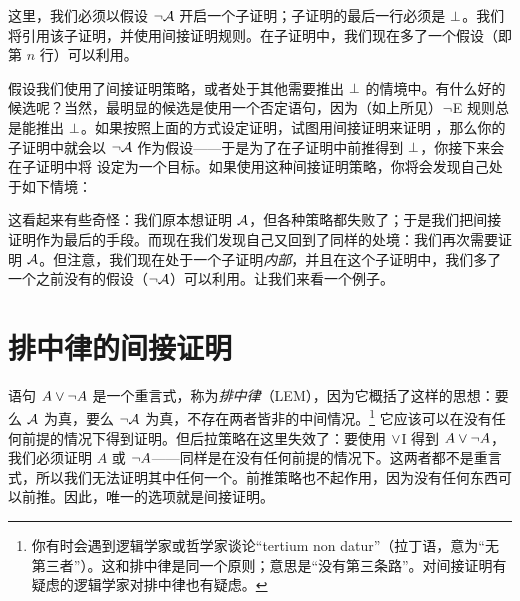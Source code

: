 \begin{fitchproof}
\open
{}\AS
\ellipsesline
{}
\close
{}
\end{fitchproof}

这里，我们必须以假设 $\neg \mathcal{A}$ 开启一个子证明；子证明的最后一行必须是 $\bot$。我们将引用该子证明，并使用间接证明规则。在子证明中，我们现在多了一个假设（即第 $n$ 行）可以利用。

假设我们使用了间接证明策略，或者处于其他需要推出 $\bot$ 的情境中。有什么好的候选呢？当然，最明显的候选是使用一个否定语句，因为（如上所见）$\neg$E 规则总是能推出 $\bot$。如果按照上面的方式设定证明，试图用间接证明来证明 ，那么你的子证明中就会以 $\neg \mathcal{A}$ 作为假设——于是为了在子证明中前推得到 $\bot$，你接下来会在子证明中将  设定为一个目标。如果使用这种间接证明策略，你将会发现自己处于如下情境：

\begin{fitchproof}
\open
{}\AS
\ellipsesline
{}
\close
{}
\end{fitchproof}

这看起来有些奇怪：我们原本想证明 $\mathcal{A}$，但各种策略都失败了；于是我们把间接证明作为最后的手段。而现在我们发现自己又回到了同样的处境：我们再次需要证明 $\mathcal{A}$。但注意，我们现在处于一个子证明\emph{内部}，并且在这个子证明中，我们多了一个之前没有的假设（$\neg \mathcal{A}$）可以利用。让我们来看一个例子。

\section{排中律的间接证明}\label{s:proofLEM}

语句 $A \vee \neg A$ 是一个重言式，称为\emph{排中律}（LEM），因为它概括了这样的思想：要么 $\mathcal{A}$ 为真，要么 $\neg \mathcal{A}$ 为真，不存在两者皆非的中间情况。\footnote{你有时会遇到逻辑学家或哲学家谈论“tertium non datur”（拉丁语，意为“无第三者”）。这和排中律是同一个原则；意思是“没有第三条路”。对间接证明有疑虑的逻辑学家对排中律也有疑虑。} 它应该可以在没有任何前提的情况下得到证明。但后拉策略在这里失效了：要使用 $\vee$I 得到 $A \vee \neg A$，我们必须证明 $A$ 或 $\neg A$——同样是在没有任何前提的情况下。这两者都不是重言式，所以我们无法证明其中任何一个。前推策略也不起作用，因为没有任何东西可以前推。因此，唯一的选项就是间接证明。

\begin{fitchproof}
	\open
	\AS
	\ellipsesline
	\close
\end{fitchproof}

